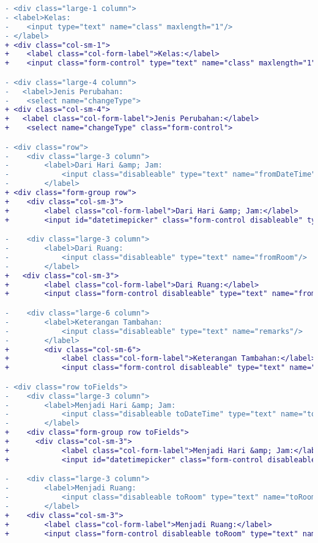 \begin{lstlisting}[language=diff, caption=Perubahan file \path{\views\PerubahanKuliahRequest\main.php} , label=Entri, basicstyle=\ttfamily, frame=single,
columns=fullflexible, keepspaces=true, breaklines=true]
- <div class="large-1 column">
- <label>Kelas:
-    <input type="text" name="class" maxlength="1"/>
- </label>
+ <div class="col-sm-1">
+    <label class="col-form-label">Kelas:</label>
+    <input class="form-control" type="text" name="class" maxlength="1"/>

- <div class="large-4 column">
-   <label>Jenis Perubahan:
-    <select name="changeType">
+ <div class="col-sm-4">
+   <label class="col-form-label">Jenis Perubahan:</label>
+    <select name="changeType" class="form-control">

- <div class="row">
-    <div class="large-3 column">
-        <label>Dari Hari &amp; Jam:
-            <input class="disableable" type="text" name="fromDateTime" id="fromDateTime"/>
-        </label>
+ <div class="form-group row">
+    <div class="col-sm-3">
+        <label class="col-form-label">Dari Hari &amp; Jam:</label>
+        <input id="datetimepicker" class="form-control disableable" type="text" name="fromDateTime">

-    <div class="large-3 column">
-        <label>Dari Ruang:
-            <input class="disableable" type="text" name="fromRoom"/>
-        </label>
+   <div class="col-sm-3">
+        <label class="col-form-label">Dari Ruang:</label>
+        <input class="form-control disableable" type="text" name="fromRoom"/>

-    <div class="large-6 column">
-        <label>Keterangan Tambahan:
-            <input class="disableable" type="text" name="remarks"/>
-        </label>
+        <div class="col-sm-6">
+            <label class="col-form-label">Keterangan Tambahan:</label>
+            <input class="form-control disableable" type="text" name="remarks"/>

- <div class="row toFields">
-    <div class="large-3 column">
-        <label>Menjadi Hari &amp; Jam:
-            <input class="disableable toDateTime" type="text" name="toDateTime[]"/>
-        </label>
+    <div class="form-group row toFields">
+      <div class="col-sm-3">
+            <label class="col-form-label">Menjadi Hari &amp; Jam:</label>
+            <input id="datetimepicker" class="form-control disableable toDateTime" type="text" name="toDateTime[]"/>

-    <div class="large-3 column">
-        <label>Menjadi Ruang:
-            <input class="disableable toRoom" type="text" name="toRoom[]"/>
-        </label>
+    <div class="col-sm-3">
+        <label class="col-form-label">Menjadi Ruang:</label>
+        <input class="form-control disableable toRoom" type="text" name="toRoom[]"/>


\end{lstlisting}
